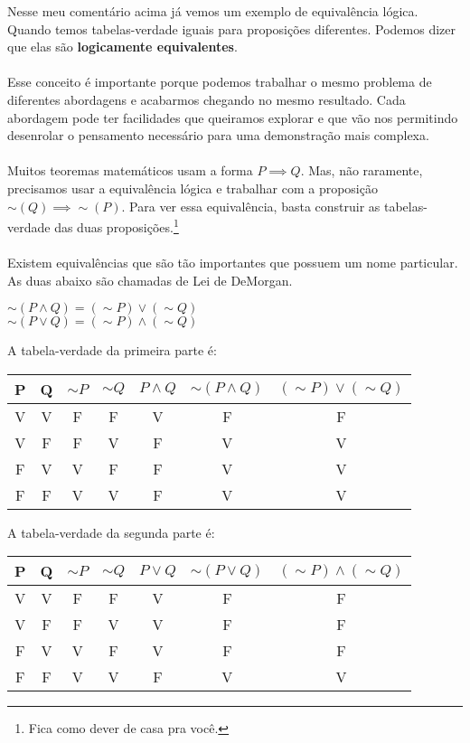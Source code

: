 \documentclass[a4paper,11pt]{book}
\theoremstyle{definition}
\theoremstyle{break}
\begin{document}
Nesse meu comentário acima já vemos um exemplo de equivalência lógica. Quando temos tabelas-verdade iguais para proposições diferentes. Podemos dizer que elas são \textbf{logicamente equivalentes}.
\\
\\
Esse conceito é importante porque podemos trabalhar o mesmo problema de diferentes abordagens e acabarmos chegando no mesmo resultado. Cada abordagem pode ter facilidades que queiramos explorar e que vão nos permitindo desenrolar o pensamento necessário para uma demonstração mais complexa.
\\
\\
Muitos teoremas matemáticos usam a forma $P \implies Q$. Mas, não raramente, precisamos usar a equivalência lógica e trabalhar com a proposição $\sim (Q) \implies \sim (P)$. Para ver essa equivalência, basta construir as tabelas-verdade das duas proposições.\footnote{Fica como dever de casa pra você.}
\\
\\
Existem equivalências que são tão importantes que possuem um nome particular. As duas abaixo são chamadas de Lei de DeMorgan.

\begin{center}
$\sim(P \land Q) = (\sim P) \lor (\sim Q)$ \\
$\sim(P \lor Q) = (\sim P) \land (\sim Q)$
\end{center}

A tabela-verdade da primeira parte é:
\begin{center}
\begin{tabular}{ c c || c c c || c c }
P & Q & $\sim P$ & $\sim Q$ & $P \land Q$ & $\sim (P \land Q)$ & $(\sim P) \lor (\sim Q)$ \\
\hline
V & V & F & F & V & F & F \\
V & F & F & V & F & V & V \\
F & V & V & F & F & V & V \\
F & F & V & V & F & V & V
\end{tabular}
\end{center}

A tabela-verdade da segunda parte é:
\begin{center}
\begin{tabular}{ c c || c c c || c c }
P & Q & $\sim P$ & $\sim Q$ & $P \lor Q$ & $\sim (P \lor Q)$ & $(\sim P) \land (\sim Q)$ \\
\hline
V & V & F & F & V & F & F \\
V & F & F & V & V & F & F \\
F & V & V & F & V & F & F \\
F & F & V & V & F & V & V
\end{tabular}
\end{center}
\end{document}
